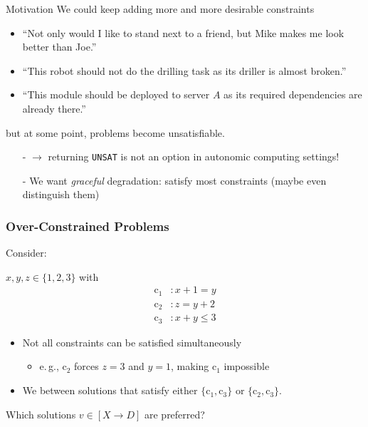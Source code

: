 \begin{frame}{Motivation}
We could keep adding more and more desirable constraints

\begin{itemize}
\item ``Not only would I like to stand next to a friend, but Mike makes me look better than Joe.''
\item ``This robot should not do the drilling task as its driller is almost broken.''
\item ``This module should be deployed to server $A$ as its required dependencies are already there.''
\end{itemize}

\vspace*{1ex} \pause 
but at some point, problems become \alert{unsatisfiable}.

\vspace*{2ex} \pause 

\begin{itemize}
\item[-] $\rightarrow$ returning \texttt{UNSAT} is not an option in autonomic computing settings! \pause 
\item[-] We want \emph{graceful} degradation: satisfy most 
constraints (maybe even distinguish them)
\end{itemize}

\end{frame}

\begin{frame}
\frametitle{Over-Constrained Problems}

\vspace*{1ex}

Consider: 

\vspace*{2ex}

$x, y, z \in \{1,2,3\}$ with 
\bgroup{}
\begin{align*}
  \mathrm{c}_1 &: x + 1 = y
\\[-.4ex]
  \mathrm{c}_2 &: z = y + 2
\\[-.4ex]
  \mathrm{c}_3 &: x + y \leq 3
\end{align*}
\egroup

\begin{itemize}
  \item Not all constraints can be satisfied simultaneously 
\begin{itemize} \pause
  \item e.\,g., $\mathrm{c}_2$ forces $z = 3$ and $y = 1$, making $\mathrm{c}_1$ impossible
\end{itemize}

  \item We  between solutions that satisfy either $\{ \mathrm{c}_1, \mathrm{c}_3 \}$ or $\{ \mathrm{c}_2, \mathrm{c}_3 \}$.
\end{itemize}

\vspace*{2ex}

Which solutions $v \in [X \to D]$ are \alert{preferred}?

\end{frame}

